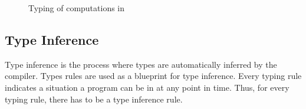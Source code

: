 \begin{figure}[!htb]
  \begin{center}
\end{center}
\caption{Typing of computations in \eff}\label{fig:eff-typing:c}
\end{figure}

\subsection{Type Inference}\label{type-inference-explain}
Type inference is the process where types are automatically inferred by the compiler. Types rules are used as a blueprint for type inference. Every typing rule indicates a situation a program can be in at any point in time. Thus, for every typing rule, there has to be a type inference rule. 

